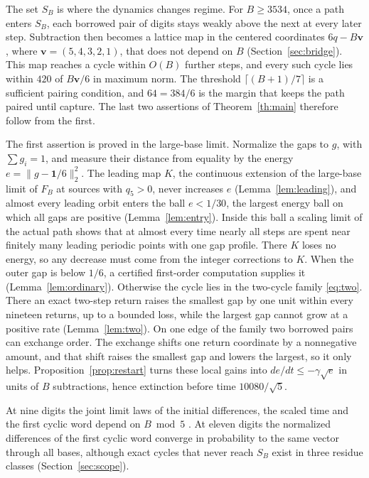 \documentclass[11pt,reqno]{amsart}
\theoremstyle{remark}
\newcommand{\vct}{\boldsymbol v}
\begin{document}
The set \(S_B\) is where the dynamics changes regime. For \(B\ge3534\), once a path enters \(S_B\), each borrowed pair of digits stays weakly above the next at every later step. Subtraction then becomes a lattice map in the centered coordinates \(6q-B\vct\), where \(\vct=(5,4,3,2,1)\), that does not depend on \(B\) (Section~\ref{sec:bridge}). This map reaches a cycle within \(O(B)\) further steps, and every such cycle lies within \(420\) of \(B\vct/6\) in maximum norm. The threshold \(\lceil(B+1)/7\rceil\) is a sufficient pairing condition, and \(64=384/6\) is the margin that keeps the path paired until capture. The last two assertions of Theorem~\ref{th:main} therefore follow from the first.

The first assertion is proved in the large-base limit. Normalize the gaps to \(g\), with \(\sum g_i=1\), and measure their distance from equality by the energy \(e=\|g-\boldsymbol1/6\|_2^2\). The leading map \(K\), the continuous extension of the large-base limit of \(F_B\) at sources with \(q_5>0\), never increases \(e\) (Lemma~\ref{lem:leading}), and almost every leading orbit enters the ball \(e<1/30\), the largest energy ball on which all gaps are positive (Lemma~\ref{lem:entry}). Inside this ball a scaling limit of the actual path shows that at almost every time nearly all steps are spent near finitely many leading periodic points with one gap profile. There \(K\) loses no energy, so any decrease must come from the integer corrections to \(K\). When the outer gap is below \(1/6\), a certified first-order computation supplies it (Lemma~\ref{lem:ordinary}). Otherwise the cycle lies in the two-cycle family \eqref{eq:two}. There an exact two-step return raises the smallest gap by one unit within every nineteen returns, up to a bounded loss, while the largest gap cannot grow at a positive rate (Lemma~\ref{lem:two}). On one edge of the family two borrowed pairs can exchange order. The exchange shifts one return coordinate by a nonnegative amount, and that shift raises the smallest gap and lowers the largest, so it only helps. Proposition~\ref{prop:restart} turns these local gains into \(de/dt\le-\gamma\sqrt e\) in units of \(B\) subtractions, hence extinction before time \(10080/\sqrt5\).

At nine digits the joint limit laws of the initial differences, the scaled time and the first cyclic word depend on \(B\bmod5\) \cite[Theorem~2]{G4}. At eleven digits the normalized differences of the first cyclic word converge in probability to the same vector through all bases, although exact cycles that never reach \(S_B\) exist in three residue classes (Section~\ref{sec:scope}).
\end{document}
